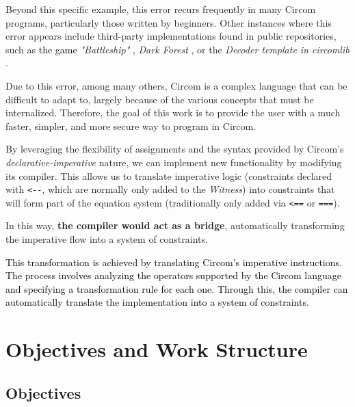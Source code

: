 \documentclass[a4paper,12pt]{report}
\begin{document}
	\vspace{0.2cm}
	\noindent Beyond this specific example, this error recurs frequently in many Circom programs, particularly those written by beginners. Other instances where this error appears include third-party implementations found in public repositories, such as \textcolor{black}{the game} \textit{"Battleship"} \cite{battlezips_circom}, \textit{Dark Forest} \cite{darkforest_circuits_2021}, or the \textit{Decoder template in circomlib} \cite{iden3_multiplexer_2023}.
	
	
	\vspace{0.2cm}
	\noindent Due to this error, among many others, Circom is a complex language that can be difficult to adapt to, largely because of the various concepts that must be internalized. Therefore, the goal of this work is to provide the user with a much faster, simpler, and more secure way to program in Circom.
	
	
	\vspace{0.2cm}
	\noindent By leveraging the flexibility of assignments and the syntax provided by Circom's \textit{declarative-imperative} nature, we can implement new functionality by modifying its compiler. This allows us to translate imperative logic (constraints declared with \texttt{<-}\texttt{-}, which are normally only added to the \textit{Witness}) into constraints that will form part of the equation system (traditionally only added via \texttt{<==} or \texttt{===}).
	
	\vspace{0.2cm}
	\noindent In this way, \textbf{the compiler would act as a bridge}, automatically transforming the imperative flow into a system of constraints.
	
	\vspace{0.4cm}
	\noindent \textcolor{black}{This transformation is achieved by translating Circom's imperative instructions. The process involves analyzing the operators supported by the Circom language and specifying a transformation rule for each one. Through this, the compiler can automatically translate the implementation into a system of constraints.}
	
	\section{Objectives and Work Structure}
	
	\subsection{Objectives}
	
\end{document}
